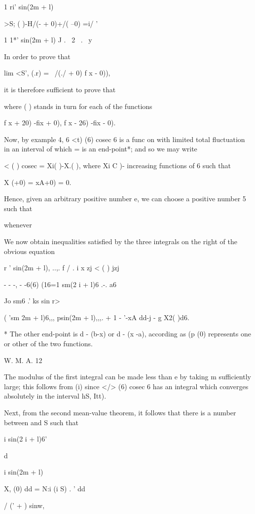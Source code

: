 1 ri' sin(2m + l)

>S; ( )-H/(- + 0)+/( --0) =i/ '

  1 1*' sin(2m + l) J . \ 2 \, . \ y

In order to prove that

lim <S', (.r) = \ /(./ + 0) f x - 0)),

it is therefore sufficient to prove that

where ( ) stands in turn for each of the functions

f x + 20) -fix + 0), f x - 26) -fix - 0).

Now, by example 4, 6 <t) (6) cosec 6 is a func on with limited
total fluctuation in an interval of which = is an end-point*; and so
we may write

  < ( ) cosec = Xi( )-X.( ), where Xi C )- %
increasing functions of 6 such that

X (+0) = xA+0) = 0.

Hence, given an arbitrary positive number e, we can choose a positive
number 5 such that

whenever %

We now obtain inequalities satisfied by the three integrals on the
right of the obvious equation

r ' sin(2m + l), ..,. f  / . i x zj < ( ) jzj

 - - -, - -6(6) (16=1 sm(2 i + l)6 .-. a6

Jo sm6 .' ks sin r>

( 'sm 2m + l)6,,, psin(2m + l),,,. + 1 - '-xA dd-j - g X2( )d6.

* The other end-point is d - (b-x) or d - (x -a), according as (p (0)
represents one or other of the two functions.

W. M. A. 12

%
%

The modulus of the first integral can be made less than e by taking m
sufficiently large; this follows from (i) since </> (6) cosec
6 has an integral which converges absolutely in the interval hS, Itt).

Next, from the second mean-value theorem, it follows that there is a
number between and S such that

i sin(2 i + l)6'

d

i sin(2m + l)

X, (0) dd = N:i (i S) . ' dd

  / (' + ) sinw,

